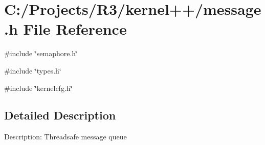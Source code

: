 \section{C:/Projects/R3/kernel++/message.h File Reference}
\label{message_8h}
{\ttfamily \#include \char`\"{}semaphore.h\char`\"{}}\par
{\ttfamily \#include \char`\"{}types.h\char`\"{}}\par
{\ttfamily \#include \char`\"{}kernelcfg.h\char`\"{}}\par


\subsection{Detailed Description}
Description: Threadsafe message queue 